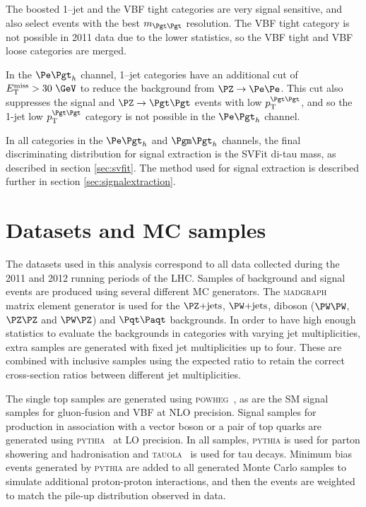 The boosted 1--jet and the VBF tight categories are very 
signal sensitive, and also select events with the best $m_{\Pgt\Pgt}$ resolution.
The VBF tight category is not possible in 2011 data due to the lower statistics,
so the VBF tight and VBF loose categories are merged. 

In the $\etau$ channel, 1--jet categories have an additional cut of $\MET >
30~\GeV$ to reduce the background from $\PZ\to\Pe\Pe$. This cut also suppresses the
signal and $\ZToTauTau$ events with low $\pt^{\Pgt\Pgt}$, and so the 1-jet low
$\pt^{\Pgt\Pgt}$ category is not possible in the $\etau$ channel. 

In all categories in the $\etau$ and $\mutau$ channels, the final discriminating
distribution for signal extraction is the SVFit di-tau mass, as described in
section \ref{sec:svfit}. The method used for signal extraction is described
further in section \ref{sec:signalextraction}.

\section{Datasets and \ac{MC} samples}
\label{sec:dataandMC}

The datasets used in this analysis correspond to all data collected during the 2011 and
2012 running periods of the \ac{LHC}. Samples of background and signal events are produced using several different
\ac{MC} generators. The \textsc{madgraph}~\cite{Alwall:2011uj} matrix element
generator is used for the $\ZJets$, $\WJets$, diboson ($\PW\PW$, $\PZ\PZ$ and
$\PW\PZ$) and $\ttbar$ backgrounds. 
In order to have high enough statistics to evaluate the
backgrounds in categories with varying jet multiplicities, extra samples are
generated with fixed jet multiplicities up to four. These are combined with
inclusive samples using the expected ratio to retain the correct cross-section
ratios between different jet multiplicities. 

The single top samples are generated using
\textsc{powheg}~\cite{Frixione:2007vw,Alioli:2010xd,Alioli:2010xa}, as are the
\ac{SM} signal samples for gluon-fusion and \ac{VBF} at \ac{NLO} precision. Signal
samples for production in association with a vector boson or a pair of top
quarks are generated using
\textsc{pythia}~\cite{Sjostrand:2006za} at \ac{LO} precision. In all
samples, \textsc{pythia} is used for parton showering and hadronisation and
\textsc{tauola}~\cite{TAUOLA} is used for tau decays. Minimum bias events
generated by \textsc{pythia} are added to all generated Monte Carlo samples
to simulate additional proton-proton interactions, and then the events are
weighted to match the pile-up distribution observed in data. 


